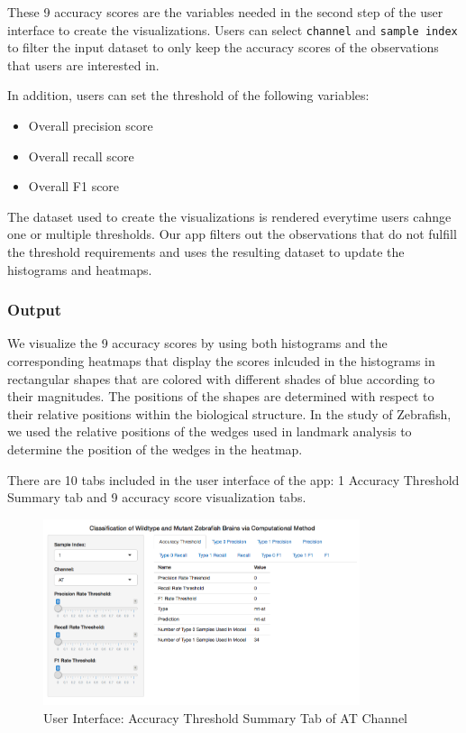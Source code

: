\documentclass[10pt,letterpaper]{article}
\providecommand{\tightlist}{%
  \setlength{\itemsep}{0pt}\setlength{\parskip}{0pt}}
\begin{document}
These 9 accuracy scores are the variables needed in the second step of
the user interface to create the visualizations. Users can select
\texttt{channel} and \texttt{sample\ index} to filter the input dataset
to only keep the accuracy scores of the observations that users are
interested in.

In addition, users can set the threshold of the following variables:

\begin{itemize}
\tightlist
\item
  Overall precision score
\item
  Overall recall score
\item
  Overall F1 score
\end{itemize}

The dataset used to create the visualizations is rendered everytime
users cahnge one or multiple thresholds. Our app filters out the
observations that do not fulfill the threshold requirements and uses the
resulting dataset to update the histograms and heatmaps.

\subsubsection{Output}\label{output}

We visualize the 9 accuracy scores by using both histograms and the
corresponding heatmaps that display the scores inlcuded in the
histograms in rectangular shapes that are colored with different shades
of blue according to their magnitudes. The positions of the shapes are
determined with respect to their relative positions within the
biological structure. In the study of Zebrafish, we used the relative
positions of the wedges used in landmark analysis to determine the
position of the wedges in the heatmap.

There are 10 tabs included in the user interface of the app: 1 Accuracy
Threshold Summary tab and 9 accuracy score visualization tabs.

\begin{figure}[h]

{\centering \includegraphics[width=3.66in]{figures/shiny1} 

}

\caption{User Interface: Accuracy Threshold Summary Tab of AT Channel}\label{fig:shiny1}
\end{figure}
\end{document}
